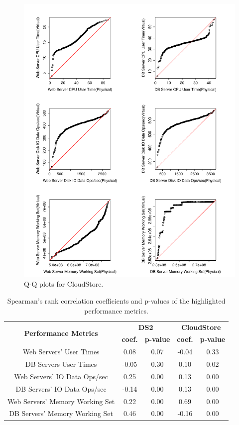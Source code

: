 \documentclass[smallextended]{svjour3}       %
\begin{document}
\begin{figure}[thb]
	\centering
	\includegraphics[width=0.9\columnwidth]{CS_qq.pdf}
	\caption{Q-Q plots for CloudStore.}
	\label{fig:qqcs}
\end{figure}



\begin{table}[thb]
	\centering
	\caption{Spearman's rank correlation coefficients and p-values of the highlighted performance metrics.}
	\label{tab:correlationrq1}
	\begin{tabular}{|c||c|c|c|c|}
		\hline
		\multirow{2}{*}{\textbf{Performance Metrics}} & \multicolumn{2}{c|}{\textbf{DS2}} & \multicolumn{2}{c|}{\textbf{CloudStore}} \\ \cline{2-5} 
		& \textbf{coef.} & \textbf{p-value} & \textbf{coef.} & \textbf{p-value} \\ %
		\midrule 
		\midrule 
		Web Servers' User Times & 0.08 & 0.07 & -0.04 & 0.33 \\ \hline
		DB Servers User Times & -0.05 & 0.30 & 0.10 & 0.02 \\ \hline
		Web Servers' IO Data Ops/sec & 0.25 & 0.00 & 0.13 & 0.00 \\ \hline
		DB Servers' IO Data Ops/sec & -0.14 & 0.00 & 0.13 & 0.00 \\ \hline
		Web Servers' Memory Working Set & 0.22 & 0.00 & 0.69 & 0.00 \\ \hline
		DB Servers' Memory Working Set & 0.46 & 0.00 & -0.16 & 0.00 \\ \hline
	\end{tabular}
\end{table}
\end{document}
